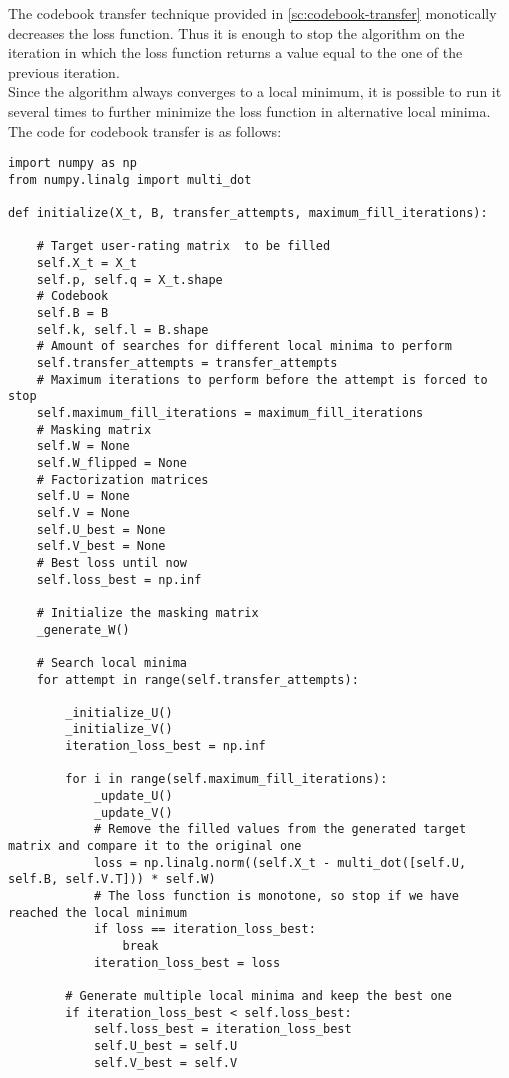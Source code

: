 The codebook transfer technique provided in \autoref{sc:codebook-transfer} monotically decreases the loss function. Thus it is enough to stop the algorithm on the iteration in which the loss function returns a value equal to the one of the previous iteration.\\
Since the algorithm always converges to a local minimum, it is possible to run it several times to further minimize the loss function in alternative local minima.\\
The code for codebook transfer is as follows:
\begin{verbatim}
import numpy as np
from numpy.linalg import multi_dot

def initialize(X_t, B, transfer_attempts, maximum_fill_iterations):

    # Target user-rating matrix  to be filled
    self.X_t = X_t
    self.p, self.q = X_t.shape
    # Codebook
    self.B = B
    self.k, self.l = B.shape
    # Amount of searches for different local minima to perform
    self.transfer_attempts = transfer_attempts
    # Maximum iterations to perform before the attempt is forced to stop
    self.maximum_fill_iterations = maximum_fill_iterations
    # Masking matrix
    self.W = None
    self.W_flipped = None
    # Factorization matrices
    self.U = None
    self.V = None
    self.U_best = None
    self.V_best = None
    # Best loss until now
    self.loss_best = np.inf
    
    # Initialize the masking matrix
    _generate_W()
    
    # Search local minima
    for attempt in range(self.transfer_attempts):
    
        _initialize_U()
        _initialize_V()
        iteration_loss_best = np.inf
        
        for i in range(self.maximum_fill_iterations):
            _update_U()
            _update_V()
            # Remove the filled values from the generated target matrix and compare it to the original one
            loss = np.linalg.norm((self.X_t - multi_dot([self.U, self.B, self.V.T])) * self.W)
            # The loss function is monotone, so stop if we have reached the local minimum
            if loss == iteration_loss_best:
                break
            iteration_loss_best = loss

        # Generate multiple local minima and keep the best one
        if iteration_loss_best < self.loss_best:
            self.loss_best = iteration_loss_best
            self.U_best = self.U
            self.V_best = self.V


\end{verbatim}
